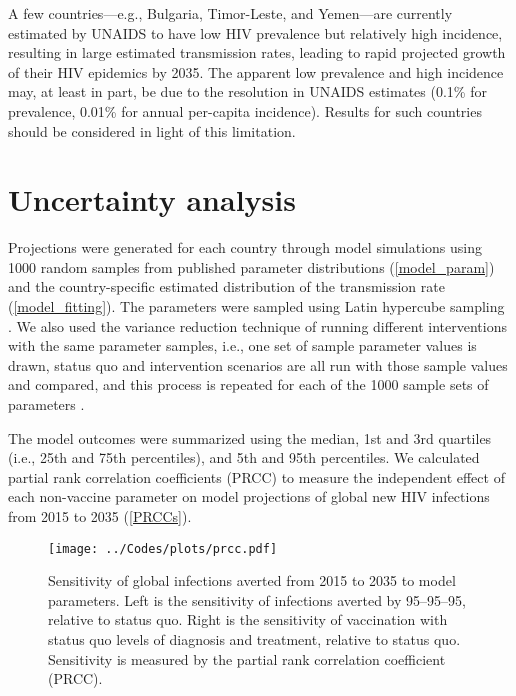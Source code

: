 \documentclass{article}
\begin{document}
A few countries—e.g., Bulgaria, Timor-Leste, and Yemen—are currently
estimated by UNAIDS to have low HIV prevalence but relatively high
incidence, resulting in large estimated transmission rates, leading to
rapid projected growth of their HIV epidemics by 2035. The apparent
low prevalence and high incidence may, at least in part, be due to the
resolution in UNAIDS estimates (0.1\% for prevalence, 0.01\% for
annual per-capita incidence).  Results for such countries should be
considered in light of this limitation.


\section{Uncertainty analysis}
\label{uncertainty}

Projections were generated for each country through model simulations
using 1000 random samples from published parameter distributions
(\autoref{model_param}) and the country-specific estimated
distribution of the transmission rate (\autoref{model_fitting}). The
parameters were sampled using Latin hypercube sampling
\cite{blower1994}.  We also used the variance reduction technique of
running different interventions with the same parameter samples, i.e.,
one set of sample parameter values is drawn, status quo and
intervention scenarios are all run with those sample values and
compared, and this process is repeated for each of the 1000 sample
sets of parameters \cite{shechter2006}.

The model outcomes were summarized using the median, 1st and 3rd
quartiles (i.e., 25th and 75th percentiles), and 5th and 95th
percentiles.  We calculated partial rank correlation coefficients
(PRCC) \cite{blower1994} to measure the independent effect of each
non-vaccine parameter on model projections of global new HIV
infections from 2015 to 2035 (\autoref{PRCCs}).

\begin{figure}
  \centering
  \texttt{[image: ../Codes/plots/prcc.pdf]}
  \caption{Sensitivity of global infections averted from 2015 to 2035
    to model parameters.  Left is the sensitivity of infections
    averted by 95--95--95, relative to status quo.  Right is the
    sensitivity of vaccination with status quo levels of diagnosis and
    treatment, relative to status quo.  Sensitivity is measured by the
    partial rank correlation coefficient (PRCC).}
  \label{PRCCs}
\end{figure}
\end{document}
